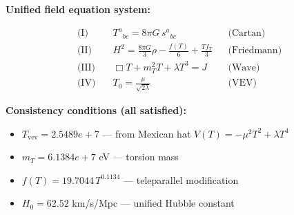 
\textbf{Unified field equation system:}

\begin{align}
  \text{(I)} \quad & T^a{}_{bc} = 8\pi G \, s^a{}_{bc} && \text{(Cartan)} \\
  \text{(II)} \quad & H^2 = \frac{8\pi G}{3}\rho - \frac{f(T)}{6} + \frac{Tf_T}{3} && \text{(Friedmann)} \\
  \text{(III)} \quad & \Box T + m_T^2 T + \lambda T^3 = J && \text{(Wave)} \\
  \text{(IV)} \quad & T_0 = \frac{\mu}{\sqrt{2\lambda}} && \text{(VEV)}
\end{align}

\textbf{Consistency conditions (all satisfied):}
\begin{itemize}
  \item $T_{\text{vev}} = 2.5489e+7$ — from Mexican hat $V(T) = -\mu^2 T^2 + \lambda T^4$
  \item $m_T = 6.1384e+7$ eV — torsion mass
  \item $f(T) = 19.7044 \, T^{0.1134}$ — teleparallel modification
  \item $H_0 = 62.52$ km/s/Mpc — unified Hubble constant
\end{itemize}